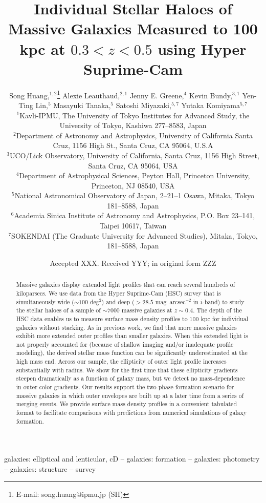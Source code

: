 \documentclass[fleqn,usenatbib]{mnras}
\title[Mass Dependent Stellar Haloes in Massive Galaxies]{Individual Stellar Haloes of 
	   Massive Galaxies Measured to 100 kpc at $0.3<z<0.5$ using Hyper Suprime-Cam}
\author[S. Huang et al.]{
        Song Huang,$^{1,2}$\thanks{E-mail: song.huang@ipmu.jp (SH)}
        Alexie Leauthaud,$^{2,1}$
        Jenny E. Greene,$^{4}$
        Kevin Bundy,$^{3,1}$
        \newauthor
        Yen-Ting Lin,$^{5}$
        Masayuki Tanaka,$^{5}$
        Satoshi Miyazaki,$^{5,7}$
        \newauthor
        Yutaka Komiyama$^{5,7}$
        \\
        $^{1}$Kavli-IPMU, The University of Tokyo Institutes for Advanced Study, 
              the University of Tokyo, Kashiwa 277--8583, Japan\\
        $^{2}$Department of Astronomy and Astrophysics, University of California 
              Santa Cruz, 1156 High St., Santa Cruz, CA 95064, U.S.A\\
        $^{3}$UCO/Lick Observatory, University of California, Santa Cruz,
              1156 High Street, Santa Cruz, CA 95064, USA\\
        $^{4}$Department of Astrophysical Sciences, Peyton Hall,
              Princeton University, Princeton, NJ 08540, USA \\
        $^{5}$National Astronomical Observatory of Japan, 2--21--1 Osawa, Mitaka, 
              Tokyo 181--8588, Japan\\
        $^{6}$Academia Sinica Institute of Astronomy and Astrophysics, 
              P.O. Box 23--141, Taipei 10617, Taiwan\\
        $^{7}$SOKENDAI (The Graduate University for Advanced Studies), Mitaka,
              Tokyo, 181--8588, Japan
        }
\date{Accepted XXX. Received YYY; in original form ZZZ}
\def\sb{mag~arcsec$^{-2}$}
\begin{document}
\label{firstpage}
\pagerange{\pageref{firstpage}--\pageref{lastpage}}

\maketitle


\begin{abstract} 

    Massive galaxies display extended light profiles that can reach several 
    hundreds of kiloparsecs. 
    We use data from the Hyper Suprime-Cam (HSC) survey that is simultaneously wide 
    (${\sim}100$ deg$^2$) and deep ($>28.5$ \sb{} in $i$-band) to study the stellar 
    haloes of a sample of ${\sim}7000$ massive galaxies at $z{\sim}0.4$. 
    The depth of the HSC data enables us to measure surface mass density profiles 
    to 100 kpc for individual galaxies without stacking. 
    As in previous work, we find that more massive galaxies exhibit more extended outer 
    profiles than smaller galaxies.
    When this extended light is not properly accounted for (because of shallow imaging 
    and/or inadequate profile modeling), the derived stellar mass function can be 
    significantly underestimated at the high mass end.  
    Across our sample, the ellipticity of outer light profile increases substantially 
    with radius.  
    We show for the first time that these ellipticity gradients steepen dramatically as 
    a function of galaxy mass, but we detect no mass-dependence in outer color gradients. 
    Our results support the two-phase formation scenario for massive galaxies in which 
    outer envelopes are built up at a later time from a series of merging events. 
    We provide surface mass density profiles in a convenient tabulated format 
    to facilitate comparisons with predictions from numerical simulations of 
    galaxy formation.
    
\end{abstract}


\begin{keywords}
    galaxies: elliptical and lenticular, cD --
    galaxies: formation --
    galaxies: photometry -- 
    galaxies: structure -- 
    survey 
\end{keywords}

\end{document}
